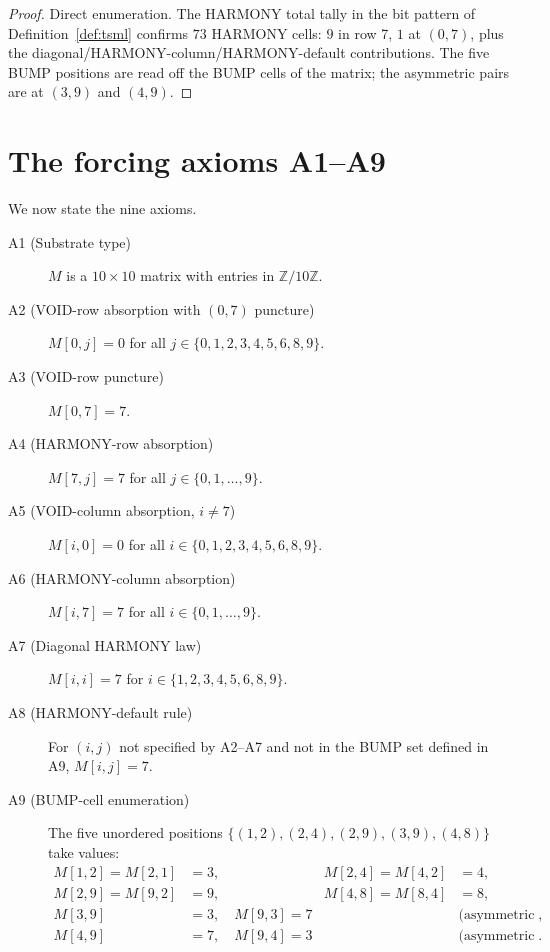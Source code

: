 \documentclass[11pt,reqno]{amsart}
\theoremstyle{plain}
\theoremstyle{definition}
\theoremstyle{remark}
\newcommand{\Z}{\mathbb{Z}}
\begin{document}
\begin{proof}
Direct enumeration. The HARMONY total tally in the bit pattern of
Definition~\ref{def:tsml} confirms $73$ HARMONY cells: $9$ in row 7,
$1$ at $(0,7)$, plus the diagonal/HARMONY-column/HARMONY-default
contributions. The five BUMP positions are read off the BUMP cells of
the matrix; the asymmetric pairs are at $(3,9)$ and $(4,9)$.
\end{proof}

\section{The forcing axioms A1--A9}
\label{sec:axioms}

We now state the nine axioms.

\begin{description}
\item[A1 (Substrate type)] $M$ is a $10 \times 10$ matrix with entries
in $\Z/10\Z$.

\item[A2 (VOID-row absorption with $(0,7)$ puncture)]
$M[0, j] = 0$ for all $j \in \{0, 1, 2, 3, 4, 5, 6, 8, 9\}$.

\item[A3 (VOID-row puncture)] $M[0, 7] = 7$.

\item[A4 (HARMONY-row absorption)] $M[7, j] = 7$ for all
$j \in \{0, 1, \ldots, 9\}$.

\item[A5 (VOID-column absorption, $i \neq 7$)]
$M[i, 0] = 0$ for all $i \in \{0, 1, 2, 3, 4, 5, 6, 8, 9\}$.

\item[A6 (HARMONY-column absorption)] $M[i, 7] = 7$ for all
$i \in \{0, 1, \ldots, 9\}$.

\item[A7 (Diagonal HARMONY law)]
$M[i, i] = 7$ for $i \in \{1, 2, 3, 4, 5, 6, 8, 9\}$.

\item[A8 (HARMONY-default rule)]
For $(i, j)$ not specified by A2--A7 and not in the BUMP set
defined in A9, $M[i, j] = 7$.

\item[A9 (BUMP-cell enumeration)]
The five unordered positions
$\{(1,2),(2,4),(2,9),(3,9),(4,8)\}$
take values:
\begin{align*}
M[1, 2] = M[2, 1] &= 3, &
M[2, 4] = M[4, 2] &= 4, \\
M[2, 9] = M[9, 2] &= 9, &
M[4, 8] = M[8, 4] &= 8, \\
M[3, 9] &= 3,\quad M[9, 3] = 7 &
&\text{(asymmetric pair)}, \\
M[4, 9] &= 7,\quad M[9, 4] = 3 &
&\text{(asymmetric pair)}.
\end{align*}
\end{description}
\end{document}
